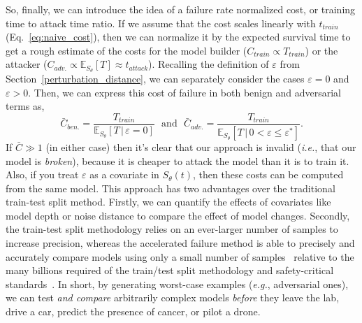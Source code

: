 So, finally, we can introduce the idea of a failure rate normalized cost, or training time to attack time ratio. If we assume that the cost scales linearly with $t_{train}$ (Eq.~\ref{eq:naive_cost}), then we can normalize it by the expected survival time to get a rough estimate of the costs for the model builder ($C_{train} \propto T_{train}$) or the attacker ($C_{adv.} \propto \mathbb{E}_{S_\theta}[T] \approx t_{attack}$). Recalling the definition of $\varepsilon$ from Section~\ref{perturbation_distance}, we can separately consider the cases $\varepsilon=0$ and $\varepsilon > 0$. Then, we can express this cost of failure in both benign and adversarial terms as,
\begin{equation}
	\bar{C}_{ben.} = \frac{T_{train}}{\mathbb{E}_{S_\theta}[T \,|\, \varepsilon = 0] }
	\text{~~and~~}
	\bar{C}_{adv.}=\frac{T_{train}}{\mathbb{E}_{S_\theta}[T \,|\, 0 < \varepsilon \leq \varepsilon^*]}.
	\label{eq:cost}
\end{equation}
If $\bar{C} \gg 1$ (in either case) then it's clear that our approach is invalid (\textit{i.e.}, that our model is \textit{broken}), because it is cheaper to attack the model than it is to train it. Also, if you treat $\varepsilon$ as a covariate in ${S_\theta}(t)$, then these costs can be computed from the same model.
This approach has two advantages over the traditional train-test split method. Firstly, we can quantify the effects of covariates like model depth or noise distance to compare the effect of model changes. Secondly, the train-test split methodology relies on an ever-larger number of samples to increase precision, whereas the accelerated failure method is able to precisely and accurately compare models using only a small number of samples~\cite{schmoor2000sample,lachin1981introduction} relative to the many billions required of the train/test split methodology and safety-critical standards~\cite{iso26262,IEC61508,IEC62034,meyers}. 
In short, by generating worst-case examples (\textit{e.g.}, adversarial ones), we can test \textit{and compare} arbitrarily complex models \textit{before} they leave the lab, drive a car, predict the presence of cancer, or pilot a drone. 